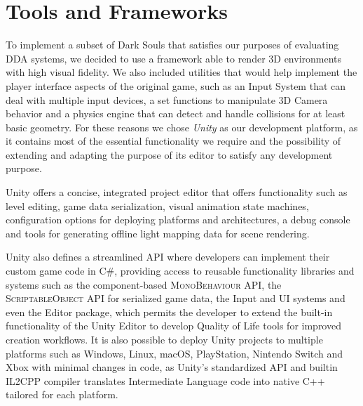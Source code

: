 

\section{Tools and Frameworks}


To implement a subset of Dark Souls that satisfies our purposes of evaluating DDA systems, we decided to use a framework able to render 3D environments with high visual fidelity. We also included utilities that would help implement the player interface aspects of the original game, such as an Input System that can deal with multiple input devices, a set functions to manipulate 3D Camera behavior and a physics engine that can detect and handle collisions for at least basic geometry. For these reasons we chose \emph{Unity} as our development platform, as it contains most of the essential functionality we require and the possibility of extending and adapting the purpose of its editor to satisfy any development purpose.

Unity offers a concise, integrated project editor that offers functionality such as level editing, game data serialization, visual animation state machines, configuration options for deploying platforms and architectures, a debug console and tools for generating offline light mapping data for scene rendering.

Unity also defines a streamlined API where developers can implement their custom game code in \textsc{C\#}, providing access to reusable functionality libraries and systems such as the component-based \textsc{MonoBehaviour} API, the \textsc{ScriptableObject} API for serialized game data, the Input and UI systems and even the Editor package, which permits the developer to extend the built-in functionality of the Unity Editor to develop Quality of Life tools for improved creation workflows. It is also possible to deploy Unity projects to multiple platforms such as Windows, Linux, macOS, PlayStation, Nintendo Switch and Xbox with minimal changes in code, as Unity's standardized API and builtin \textsc{IL2CPP} compiler translates Intermediate Language code into native \textsc{C++} tailored for each platform.


